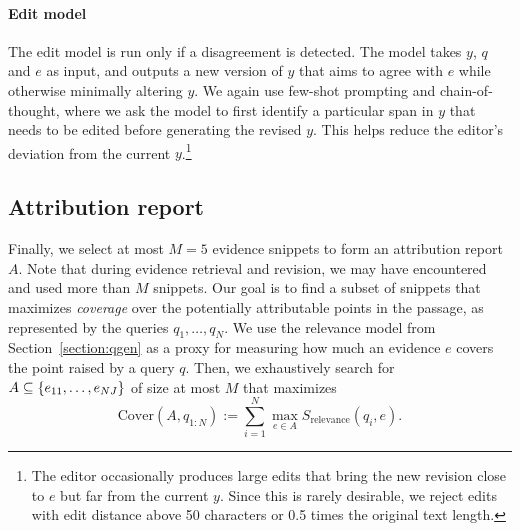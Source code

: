 \paragraph{Edit model}
The edit model is run only if a disagreement is detected.
The model takes $y$, $q$ and $e$ as input, and outputs a new version of $y$ that aims to agree with $e$ while otherwise minimally altering $y$. We again use few-shot prompting and chain-of-thought, where we ask the model to first identify a particular span in $y$ that needs to be edited before generating the revised $y$. %
This helps reduce the editor's deviation from the current $y$.\footnote{The editor occasionally produces large edits that bring the new revision close to $e$ but far from the current $y$. Since this is rarely desirable, we reject edits with edit distance above 50 characters or 0.5 times the original text length.}


\subsection{Attribution report}\label{sec:attribution-report}

Finally, we select at most $M=5$ evidence snippets to form an attribution report $A$. Note that during evidence retrieval and revision, we may have encountered and used more than $M$ snippets.
Our goal is to find a subset of snippets that maximizes \emph{coverage} over the potentially attributable points in the passage, as represented by the queries ${q_1,\dots,q_N}$. We use the relevance model from Section~\ref{section:qgen} as a proxy for measuring how much an evidence $e$ covers the point raised by a query $q$. Then, we exhaustively search for $A \subseteq \{e_{11}, \dots, e_{NJ}\}$ of size at most $M$ that maximizes
\begin{equation}
\text{Cover}(A, q_{1:N}) := \sum_{i=1}^N \max_{e \in A} S_{\text{relevance}}(q_i, e).
\end{equation}
